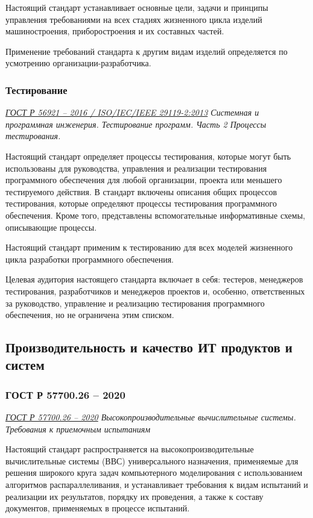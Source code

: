 Настоящий стандарт устанавливает основные цели,
задачи и принципы управления требованиями
на всех стадиях жизненного цикла изделий машиностроения,
приборостроения и их составных частей.

Применение требований стандарта к другим видам изделий определяется
по усмотрению организации-разработчика.

\subsubsection{Тестирование}

\emph{\href{https://docs.cntd.ru/document/1200134997}
{ГОСТ Р 56921 -- 2016 / ISO/IEC/IEEE 29119-2:2013}
Системная и программная инженерия.
Тестирование программ.
Часть 2 Процессы тестирования.
}

Настоящий стандарт определяет процессы тестирования,
которые могут быть использованы для руководства,
управления и реализации тестирования программного обеспечения
для любой организации, проекта или меньшего тестируемого действия.
В стандарт включены описания общих процессов тестирования,
которые определяют процессы тестирования программного обеспечения.
Кроме того, представлены вспомогательные информативные схемы,
описывающие процессы.

Настоящий стандарт применим к тестированию
для всех моделей жизненного цикла разработки программного обеспечения.

Целевая аудитория настоящего стандарта включает в себя:
тестеров, менеджеров тестирования, разработчиков и менеджеров проектов и,
особенно, ответственных за руководство, управление
и реализацию тестирования программного обеспечения,
но не ограничена этим списком.

\subsection{Производительность и качество ИТ продуктов и систем}

\subsubsection{ГОСТ Р 57700.26 -- 2020}

\emph{\href{https://docs.cntd.ru/document/573114591}{ГОСТ Р 57700.26 -- 2020}
Высокопроизводительные вычислительные системы.
Требования к приемочным испытаниям
}

Настоящий стандарт распространяется
на высокопроизводительные вычислительные системы (ВВС)
универсального назначения,
применяемые для решения широкого круга задач компьютерного моделирования
с использованием алгоритмов распараллеливания,
и устанавливает требования к видам испытаний и реализации их результатов,
порядку их проведения, а также к составу документов,
применяемых в процессе испытаний.

